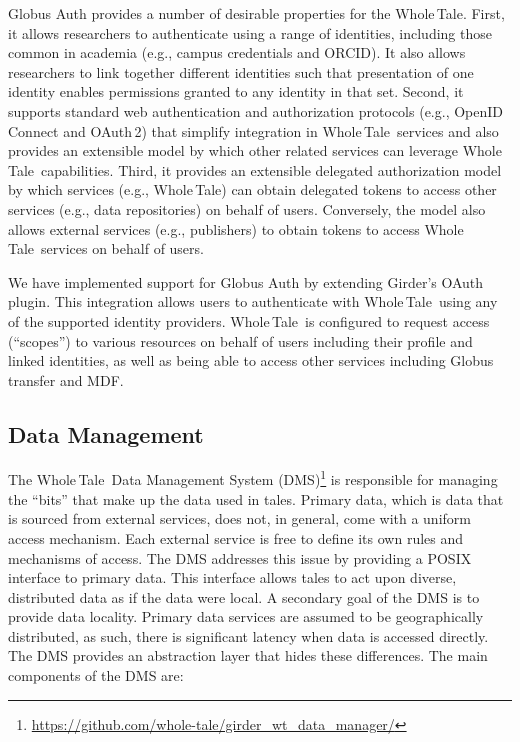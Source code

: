 \documentclass{elsarticle}
\newcommand{\wt}{Whole\,Tale}
\begin{document}
Globus Auth provides a number of desirable properties for the \wt. 
First, it allows researchers to authenticate using a range of identities, 
including those common in academia (e.g., campus credentials and ORCID).
It also allows researchers to link together different identities such that
presentation of one identity enables permissions granted to any identity
in that set. 
Second, it supports standard web authentication and authorization protocols
(e.g., OpenID Connect and OAuth\,2) that simplify integration in 
\wt\ services and also provides an extensible model by which 
other related services can leverage \wt\ capabilities. Third, it provides 
an extensible delegated authorization model by which services (e.g., \wt)
can obtain delegated tokens to access other services (e.g., data repositories)
on behalf of users. Conversely, the model also allows external services 
(e.g., publishers) to obtain tokens to access \wt\ services on behalf of users. 

We have implemented support for Globus Auth by extending Girder's OAuth plugin.
This integration allows users to authenticate with \wt\ 
using any of the supported identity 
providers. \wt\ is configured to request access (``scopes'') to various resources
on behalf of users including their profile and linked identities, 
as well as being able to access other services including Globus transfer 
and MDF. 


\subsection{Data Management}
\label{sec:dm_plugin}

The \wt\ Data Management System (DMS)\footnote{\url{https://github.com/whole-tale/girder_wt_data_manager/}} is responsible for  managing the ``bits'' that make up the data used in tales. Primary data, which is data that is sourced from external services, does not, in general, come with a uniform access mechanism. Each external service is free to define its own rules and mechanisms of access. The DMS addresses this issue by providing a POSIX interface to primary data. 
This interface allows tales to act upon diverse, distributed data as if the data were local.
A secondary goal of the DMS is to provide data locality. Primary data services are assumed to be geographically distributed, as such, there is significant latency when data is accessed directly. The DMS provides an abstraction layer that hides these differences. The main components of the DMS are:
\end{document}
